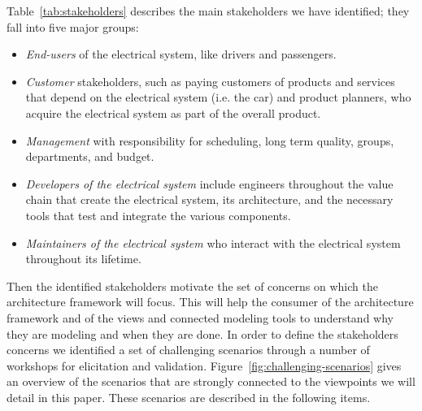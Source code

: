 Table~\ref{tab:stakeholders} describes the main stakeholders we have identified; they fall into five major groups: 

\begin{itemize}
\item \emph{End-users} of the electrical system, like drivers and passengers.
\item \emph{Customer} stakeholders, such as paying customers of products and services that depend on the electrical system (i.e. the car) and product planners, who acquire the electrical system as part of the overall product.
\item \emph{Management} with responsibility for scheduling, long term quality, groups, departments, and budget.
\item \emph{Developers of the electrical system}  include engineers throughout the value chain that create the electrical system, its architecture, and the necessary tools  that test and integrate the various components. 
\item \emph{Maintainers of the electrical system} who interact with the electrical system throughout its lifetime. 
\end{itemize}


Then the identified stakeholders motivate the set of concerns on which the architecture framework will focus.
This will help the consumer of the architecture framework and of the views and connected modeling tools to understand why
they are modeling and when they are done.
In order to define the stakeholders concerns we identified a set of challenging scenarios through a number of workshops for elicitation and validation. 
Figure~\ref{fig:challenging-scenarios} gives an overview of the scenarios that are strongly connected to the viewpoints we will detail in this paper. These scenarios are described in the following items.

